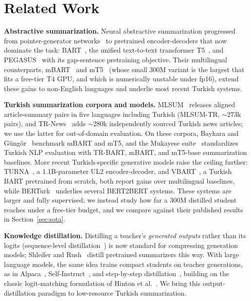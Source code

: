 \documentclass[conference]{IEEEtran}
\begin{document}
\section{Related Work}
\textbf{Abstractive summarization.} Neural abstractive summarization progressed from pointer-generator networks~\cite{see2017pointer} to pretrained encoder-decoders that now dominate the task: BART~\cite{lewis2020bart}, the unified text-to-text transformer T5~\cite{raffel2020t5}, and PEGASUS~\cite{zhang2020pegasus} with its gap-sentence pretraining objective. Their multilingual counterparts, mBART~\cite{liu2020mbart} and mT5~\cite{xue2021mt5} (whose small 300M variant is the largest that fits a free-tier T4 GPU, and which is numerically unstable under fp16), extend these gains to non-English languages and underlie most recent Turkish systems.

\textbf{Turkish summarization corpora and models.} MLSUM~\cite{scialom2020mlsum} releases aligned article-summary pairs in five languages including Turkish (MLSUM-TR, $\sim$273k pairs), and TR-News~\cite{baykara2022trnews} adds $\sim$280k independently sourced Turkish news articles; we use the latter for out-of-domain evaluation. On these corpora, Baykara and Güngör~\cite{baykara2022trnews} benchmark mBART and mT5, and the Mukayese suite~\cite{safaya2022mukayese} standardizes Turkish NLP evaluation with TR-BART, mBART, and mT5-base summarization baselines. More recent Turkish-specific generative models raise the ceiling further: TURNA~\cite{uludogan2024turna}, a 1.1B-parameter UL2 encoder-decoder, and VBART~\cite{turker2024vbart}, a Turkish BART pretrained from scratch, both report gains over multilingual baselines, while BERTurk~\cite{schweter2020berturk} underlies several BERT2BERT systems. These systems are larger and fully supervised; we instead study how far a 300M distilled student reaches under a free-tier budget, and we compare against their published results in Section~\ref{sec:sota}.

\textbf{Knowledge distillation.} Distilling a teacher's \emph{generated outputs} rather than its logits (sequence-level distillation~\cite{kim2016seqkd}) is now standard for compressing generation models; Shleifer and Rush~\cite{shleifer2020distilbart} distill pretrained summarizers this way. With large language models, the same idea trains compact students on teacher generations, as in Alpaca~\cite{taori2023alpaca}, Self-Instruct~\cite{wang2023selfinstruct}, and step-by-step distillation~\cite{hsieh2023distilling}, building on the classic logit-matching formulation of Hinton et al.~\cite{hinton2015distillation}. We bring this output-distillation paradigm to low-resource Turkish summarization.
\end{document}
